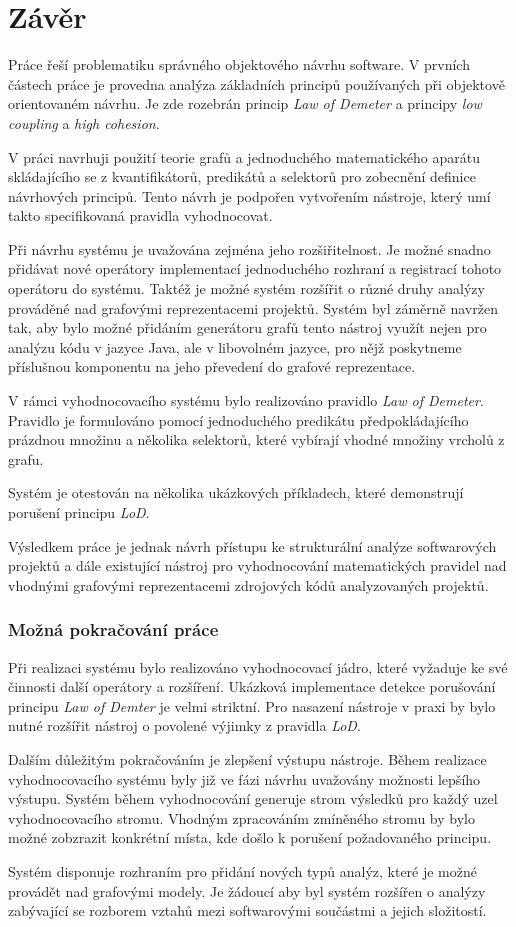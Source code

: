 \chapter{Závěr}

Práce řeší problematiku správného objektového návrhu software. V prvních částech práce je provedna analýza základních principů používaných při objektově orientovaném návrhu. Je zde rozebrán princip \emph{Law of Demeter} a principy \emph{low coupling} a \emph{high cohesion}.

V práci navrhuji použití teorie grafů a jednoduchého matematického aparátu skládajícího se z kvantifikátorů, predikátů a selektorů pro zobecnění definice návrhových principů. Tento návrh je podpořen vytvořením nástroje, který umí takto specifikovaná pravidla vyhodnocovat.

Při návrhu systému je uvažována zejména jeho rozšiřitelnost. Je možné snadno přidávat nové operátory implementací jednoduchého rozhraní a registrací tohoto operátoru do systému. Taktéž je možné systém rozšířit o různé druhy analýzy prováděné nad grafovými reprezentacemi projektů. Systém byl záměrně navržen tak, aby bylo možné přidáním generátoru grafů tento nástroj využít nejen pro analýzu kódu v jazyce Java, ale v libovolném jazyce, pro nějž poskytneme příslušnou komponentu na jeho převedení do grafové reprezentace.

V rámci vyhodnocovacího systému bylo realizováno pravidlo \emph{Law of Demeter}. Pravidlo je formulováno pomocí jednoduchého predikátu předpokládajícího prázdnou množinu a několika selektorů, které vybírají vhodné množiny vrcholů z grafu.

Systém je otestován na několika ukázkových příkladech, které demonstrují porušení principu \emph{LoD}.

Výsledkem práce je jednak návrh přístupu ke strukturální analýze softwarových projektů a dále existující nástroj pro vyhodnocování matematických pravidel nad vhodnými grafovými reprezentacemi zdrojových kódů analyzovaných projektů.

\subsection*{Možná pokračování práce}
Při realizaci systému bylo realizováno vyhodnocovací jádro, které vyžaduje ke své činnosti další operátory a rozšíření. Ukázková implementace detekce porušování principu \emph{Law of Demter} je velmi striktní. Pro nasazení nástroje v praxi by bylo nutné rozšířit nástroj o povolené výjimky z pravidla \emph{LoD}.

Dalším důležitým pokračováním je zlepšení výstupu nástroje. Během realizace vyhodnocovacího systému byly již ve fázi návrhu uvažovány možnosti lepšího výstupu. Systém během vyhodnocování generuje strom výsledků pro každý uzel vyhodnocovacího stromu. Vhodným zpracováním zmíněného stromu by bylo možné zobzrazit konkrétní místa, kde došlo k porušení požadovaného principu.

Systém disponuje rozhraním pro přidání nových typů analýz, které je možné provádět nad grafovými modely. Je žádoucí aby byl systém rozšířen o analýzy zabývající se rozborem vztahů mezi softwarovými součástmi a jejich složitostí.

